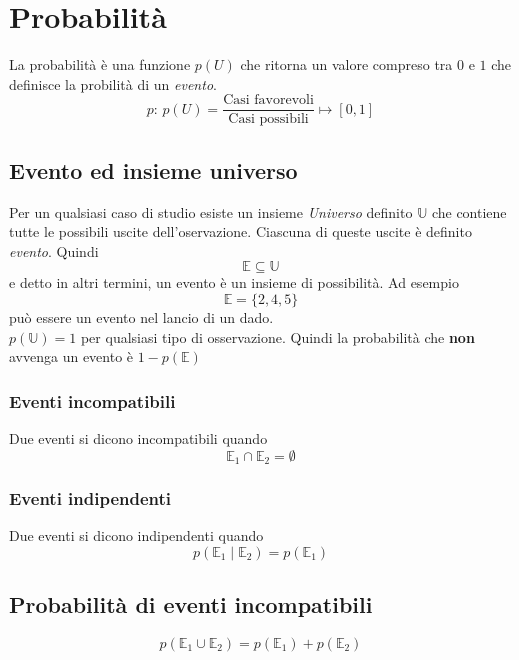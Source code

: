 
\section{Probabilità}\label{sec:prob}
La probabilità è una funzione $p(U)$ che ritorna un valore compreso tra $0$ e $1$ che definisce la 
probilità di un \emph{evento}.
\begin{equation*}
p:\,p(U) = \frac{\text{Casi favorevoli}}{\text{Casi possibili}}\mapsto {[{0},{1}]}
\end{equation*}

\subsection{Evento ed insieme universo}
Per un qualsiasi caso di studio esiste un insieme \emph{Universo} definito $\mathbb{U}$ che contiene
tutte le possibili uscite dell'oservazione. Ciascuna di queste uscite è definito \emph{evento}.
Quindi
\begin{equation*}
\mathbb{E} \subseteq \mathbb{U}
\end{equation*}
e detto in altri termini, un evento è un insieme di possibilità. Ad esempio
\begin{equation*}
\mathbb{E} = \{2,4,5\}
\end{equation*}
può essere un evento nel lancio di un dado.\\
$p(\mathbb{U}) = 1$ per qualsiasi tipo di osservazione. Quindi la probabilità che \textbf{non} avvenga
un evento è $1-p(\mathbb{E})$

\subsubsection{Eventi incompatibili}
Due eventi si dicono incompatibili quando
\begin{equation*}
\mathbb{E}_1 \cap \mathbb{E}_2 = \emptyset
\end{equation*}

\subsubsection{Eventi indipendenti}
Due eventi si dicono indipendenti quando
\begin{equation*}
p\left(\mathbb{E}_1\mid\mathbb{E}_2\right) = p(\mathbb{E}_1)
\end{equation*}

\subsection{Probabilità di eventi incompatibili}
\begin{equation*}
p(\mathbb{E}_1\cup\mathbb{E}_2) = p(\mathbb{E}_1) + p(\mathbb{E}_2)
\end{equation*}

